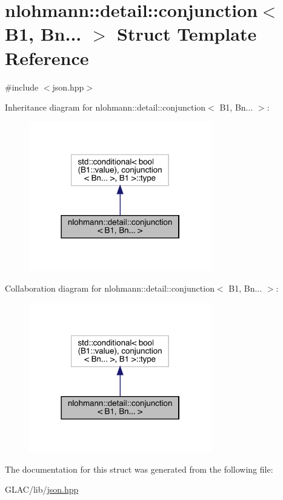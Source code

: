 \hypertarget{structnlohmann_1_1detail_1_1conjunction_3_01_b1_00_01_bn_8_8_8_01_4}{}\section{nlohmann\+::detail\+::conjunction$<$ B1, Bn... $>$ Struct Template Reference}
\label{structnlohmann_1_1detail_1_1conjunction_3_01_b1_00_01_bn_8_8_8_01_4}


{\ttfamily \#include $<$json.\+hpp$>$}



Inheritance diagram for nlohmann\+::detail\+::conjunction$<$ B1, Bn... $>$\+:\nopagebreak
\begin{figure}[H]
\begin{center}
\leavevmode
\includegraphics[width=226pt]{structnlohmann_1_1detail_1_1conjunction_3_01_b1_00_01_bn_8_8_8_01_4__inherit__graph}
\end{center}
\end{figure}


Collaboration diagram for nlohmann\+::detail\+::conjunction$<$ B1, Bn... $>$\+:\nopagebreak
\begin{figure}[H]
\begin{center}
\leavevmode
\includegraphics[width=226pt]{structnlohmann_1_1detail_1_1conjunction_3_01_b1_00_01_bn_8_8_8_01_4__coll__graph}
\end{center}
\end{figure}


The documentation for this struct was generated from the following file\+:\begin{DoxyCompactItemize}
\item 
G\+L\+A\+C/lib/\mbox{\hyperlink{json_8hpp}{json.\+hpp}}\end{DoxyCompactItemize}
